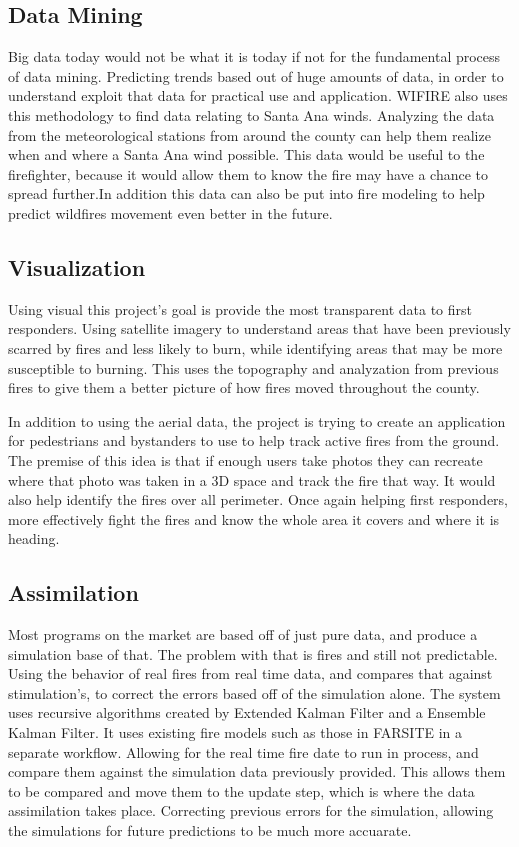 \documentclass[sigconf]{acmart}
\begin{document}
\subsection{Data Mining}
Big data today would not be what it is today if not for the fundamental process of data mining.  Predicting trends based out of huge amounts of data, in order to understand exploit that data for practical use and application. WIFIRE also uses this methodology to find data relating to Santa Ana winds.  Analyzing the data from the meteorological stations from around the county can help them realize when and where a Santa Ana wind possible. This data would be useful to the firefighter, because it would allow them to know the fire may have a chance to spread further.In addition this data can also be put into fire modeling to help predict wildfires movement even better in the future.

\subsection{Visualization}
Using visual this project's goal is provide the most transparent data to first responders. Using satellite imagery to understand areas that have been previously scarred by fires and less likely to burn, while identifying areas that may be more susceptible to burning.  This uses the topography and analyzation from previous fires to give them a better picture of how fires moved throughout the county.

In addition to using the aerial data, the project is trying to create an application for pedestrians and bystanders to use to help track active fires from the ground.  The premise of this idea is that if enough users take photos they can recreate where that photo was taken in a 3D space and track the fire that way.  It would also help identify the fires over all perimeter.  Once again helping first responders, more effectively fight the fires and know the whole area it covers and where it is heading.

\subsection{Assimilation}
Most programs on the market are based off of just pure data, and produce a simulation base of that.  The problem with that is fires and still not predictable.  Using the behavior of real fires from real time data, and compares that against stimulation's, to correct the errors based off of the simulation alone. The system uses recursive algorithms created by Extended Kalman Filter and a Ensemble Kalman Filter.   It uses existing fire models such as those in FARSITE in a separate workflow.  Allowing for the real time fire date to run in process, and compare them against the simulation data previously provided.  This allows them to be compared and move them to the update step, which is where the data assimilation takes place.  Correcting previous errors for the simulation, allowing the simulations for future predictions to be much more accuarate.
\end{document}
